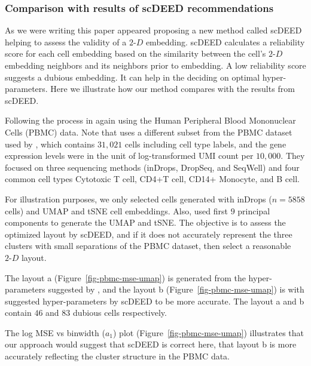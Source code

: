 \documentclass[
  12pt]{article}
\newcommand\gD{$2\text{-}D$}
\begin{document}
\subsubsection{Comparison with results of scDEED
recommendations}\label{comparison-with-results-of-scdeed-recommendations}

As we were writing this paper \citet{xia2023} appeared proposing a new
method called scDEED helping to assess the validity of a \gD{}
embedding. scDEED calculates a reliability score for each cell embedding
based on the similarity between the cell's \gD{} embedding neighbors and
its neighbors prior to embedding. A low reliability score suggests a
dubious embedding. It can help in the deciding on optimal
hyper-parameters. Here we illustrate how our method compares with the
results from scDEED.

Following the process in \citet{xia2023} again using the Human
Peripheral Blood Mononuclear Cells (PBMC) data. Note that
\citet{xia2023} uses a different subset from the PBMC dataset used by
\citet{chen2023}, which contains \(31,021\) cells including cell type
labels, and the gene expression levels were in the unit of
log-transformed UMI count per \(10,000\). They focused on three
sequencing methods (inDrops, DropSeq, and SeqWell) and four common cell
types Cytotoxic T cell, CD4+T cell, CD14+ Monocyte, and B cell.

For illustration purposes, we only selected cells generated with inDrops
(\(n=5858\) cells) and UMAP and tSNE cell embeddings. Also,
\citet{xia2023} used first \(9\) principal components to generate the
UMAP and tSNE. The objective is to assess the optimized layout by
scDEED, and if it does not accurately represent the three clusters with
small separations of the PBMC dataset, then select a reasonable \gD{}
layout.

The layout a (Figure~\ref{fig-pbmc-mse-umap}) is generated from the
hyper-parameters suggested by \citet{chen2023}, and the layout b
(Figure~\ref{fig-pbmc-mse-umap}) is with suggested hyper-parameters by
scDEED to be more accurate. The layout a and b contain \(46\) and \(83\)
dubious cells respectively.

The log MSE vs binwidth (\(a_1\)) plot (Figure~\ref{fig-pbmc-mse-umap})
illustrates that our approach would suggest that scDEED is correct here,
that layout b is more accurately reflecting the cluster structure in the
PBMC data.
\end{document}
